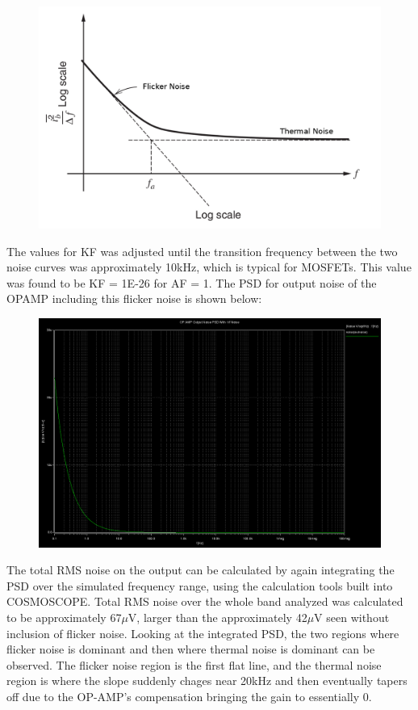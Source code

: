 \documentclass[12pt]{article}
\begin{document}
\FloatBarrier
\begin{figure}[h!]
\begin{center}
 \includegraphics[scale=0.2]{./flick.png}
\end{center}
\end{figure}
\FloatBarrier
The values for KF was adjusted until the transition frequency between the two noise curves was approximately 10kHz, which is typical for MOSFETs. This value was found to be KF = 1E-26 for AF = 1. The PSD for output noise of the OPAMP including this flicker noise is shown below:
\FloatBarrier
\begin{figure}[h!]
\begin{center}
 \includegraphics[scale=0.3]{./psd_flicker.png}
\end{center}
\end{figure}
\FloatBarrier
The total RMS noise on the output can be calculated by again integrating the PSD over the simulated frequency range, using the calculation tools built into COSMOSCOPE. Total RMS noise over the whole band analyzed was calculated to be approximately 67$\mu$V, larger than the approximately 42$\mu$V seen without inclusion of flicker noise. Looking at the integrated PSD, the two regions where flicker noise is dominant and then where thermal noise is dominant can be observed. The flicker noise region is the first flat line, and the thermal noise region is where the slope suddenly chages near 20kHz and then eventually tapers off due to the OP-AMP's compensation bringing the gain to essentially 0. 
\end{document}
